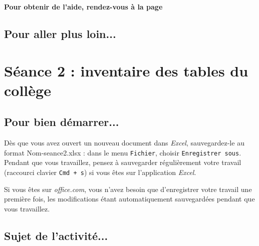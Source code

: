 \textbf{Pour obtenir de l'aide, rendez-vous à la page \pageref{Tableur5eOutils}}





\subsection{Pour aller plus loin...}

\vfill
\phantom{rien}




%
%
%
%



\section{Séance 2 : inventaire des tables du collège}\label{ficheTableur5e2}

\subsection{Pour bien démarrer...}

Dès que vous avez ouvert un nouveau document dans \emph{Excel}, sauvegardez-le au format Nom-seance2.xlsx : dans le menu \texttt{Fichier}, choisir \texttt{Enregistrer sous}. Pendant que vous travaillez, pensez à sauvegarder régulièrement votre travail (raccourci clavier \texttt{Cmd + s}) si vous êtes sur l'application \emph{Excel}.


Si vous êtes sur \emph{office.com}, vous n'avez besoin que d'enregistrer votre travail une première fois, les modifications étant automatiquement sauvegardées pendant que vous travaillez.


\subsection{Sujet de l'activité...}

\vspace{10pt}

